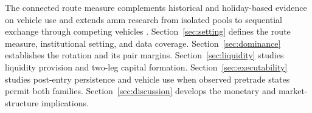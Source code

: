 The connected route measure complements historical and holiday-based evidence on vehicle use and extends \ac{amm} research from isolated pools to sequential exchange through competing vehicles \citep{LeharParlour2024Uniswap,XiMoallemi2026Routing}. Section~\ref{sec:setting} defines the route measure, institutional setting, and data coverage. Section~\ref{sec:dominance} establishes the rotation and its pair margins. Section~\ref{sec:liquidity} studies liquidity provision and two-leg capital formation. Section~\ref{sec:executability} studies post-entry persistence and vehicle use when observed pretrade states permit both families. Section~\ref{sec:discussion} develops the monetary and market-structure implications.
